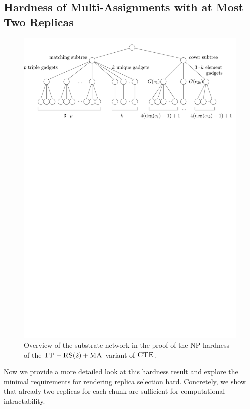 \subsection{Hardness of Multi-Assignments with at Most Two Replicas}
\begin{figure}[t]
  \centering
  \includegraphics[width=0.9\columnwidth]{figs/static-mapping/overview}
  \caption{Overview of the substrate network in the proof of the NP-hardness of the $\textsc{FP}+\textsc{RS}(2)+\textsc{MA}$ variant of $\textsc{CTE}$.}
  \label{fig:red-ma2}
\end{figure}


Now we provide a more detailed look at this hardness result
and explore the minimal requirements for rendering replica selection hard.
Concretely, we show that already two replicas for each chunk are sufficient for computational intractability.

